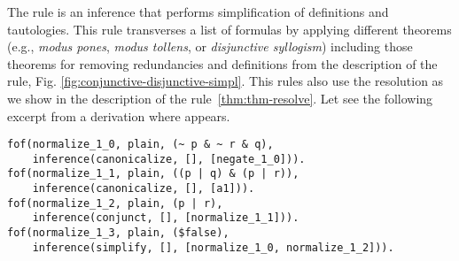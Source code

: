 \documentclass[../main.tex]{subfiles}
\begin{document}
The \simplify rule is an inference that performs simplification of
definitions and tautologies. This rule
transverses a list of formulas by applying different theorems (e.g.,
\emph{modus pones}, \emph{modus tollens}, or \emph{disjunctive
syllogism}) including those theorems for removing redundancies and definitions  from the description of the \canonicalize rule,
Fig. \ref{fig:conjunctive-disjunctive-simpl}. This rules also use the resolution as we show in the description of the \resolve rule~\ref{thm:thm-resolve}. Let see the following excerpt from a \Metis \TSTP derivation where \simplify appears.

\begin{verbatim}
fof(normalize_1_0, plain, (~ p & ~ r & q),
    inference(canonicalize, [], [negate_1_0])).
fof(normalize_1_1, plain, ((p | q) & (p | r)),
    inference(canonicalize, [], [a1])).
fof(normalize_1_2, plain, (p | r),
    inference(conjunct, [], [normalize_1_1])).
fof(normalize_1_3, plain, ($false),
    inference(simplify, [], [normalize_1_0, normalize_1_2])).
\end{verbatim}

\end{document}
